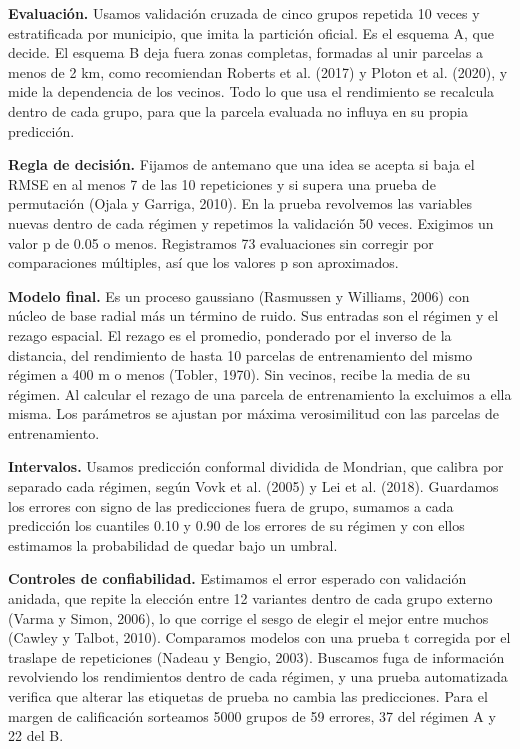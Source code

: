 \documentclass[11pt,letterpaper]{article}
\begin{document}
\textbf{Evaluación.} Usamos validación cruzada de cinco grupos repetida 10 veces y estratificada por municipio, que imita la partición oficial. Es el esquema A, que decide. El esquema B deja fuera zonas completas, formadas al unir parcelas a menos de 2 km, como recomiendan Roberts et al. (2017) y Ploton et al. (2020), y mide la dependencia de los vecinos. Todo lo que usa el rendimiento se recalcula dentro de cada grupo, para que la parcela evaluada no influya en su propia predicción.

\textbf{Regla de decisión.} Fijamos de antemano que una idea se acepta si baja el RMSE en al menos 7 de las 10 repeticiones y si supera una prueba de permutación (Ojala y Garriga, 2010). En la prueba revolvemos las variables nuevas dentro de cada régimen y repetimos la validación 50 veces. Exigimos un valor p de 0.05 o menos. Registramos 73 evaluaciones sin corregir por comparaciones múltiples, así que los valores p son aproximados.

\textbf{Modelo final.} Es un proceso gaussiano (Rasmussen y Williams, 2006) con núcleo de base radial más un término de ruido. Sus entradas son el régimen y el rezago espacial. El rezago es el promedio, ponderado por el inverso de la distancia, del rendimiento de hasta 10 parcelas de entrenamiento del mismo régimen a 400 m o menos (Tobler, 1970). Sin vecinos, recibe la media de su régimen. Al calcular el rezago de una parcela de entrenamiento la excluimos a ella misma. Los parámetros se ajustan por máxima verosimilitud con las parcelas de entrenamiento.

\textbf{Intervalos.} Usamos predicción conformal dividida de Mondrian, que calibra por separado cada régimen, según Vovk et al. (2005) y Lei et al. (2018). Guardamos los errores con signo de las predicciones fuera de grupo, sumamos a cada predicción los cuantiles 0.10 y 0.90 de los errores de su régimen y con ellos estimamos la probabilidad de quedar bajo un umbral.

\textbf{Controles de confiabilidad.} Estimamos el error esperado con validación anidada, que repite la elección entre 12 variantes dentro de cada grupo externo (Varma y Simon, 2006), lo que corrige el sesgo de elegir el mejor entre muchos (Cawley y Talbot, 2010). Comparamos modelos con una prueba t corregida por el traslape de repeticiones (Nadeau y Bengio, 2003). Buscamos fuga de información revolviendo los rendimientos dentro de cada régimen, y una prueba automatizada verifica que alterar las etiquetas de prueba no cambia las predicciones. Para el margen de calificación sorteamos 5000 grupos de 59 errores, 37 del régimen A y 22 del B.
\end{document}
